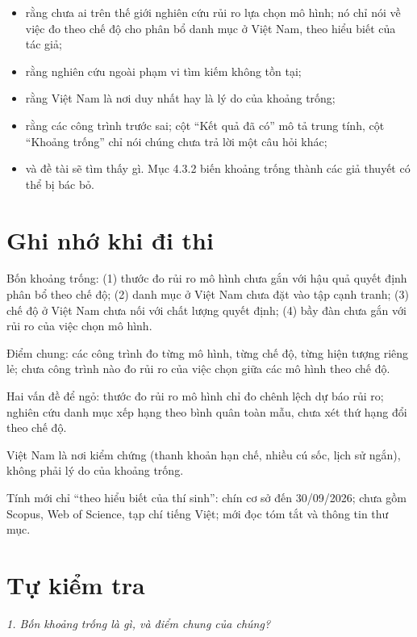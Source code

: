 \begin{itemize}
\item
  rằng chưa ai trên thế giới nghiên cứu rủi ro lựa chọn mô hình; nó chỉ nói về việc đo theo chế độ cho phân bổ danh mục ở Việt Nam, theo hiểu biết của tác giả;
\item
  rằng nghiên cứu ngoài phạm vi tìm kiếm không tồn tại;
\item
  rằng Việt Nam là nơi duy nhất hay là lý do của khoảng trống;
\item
  rằng các công trình trước sai; cột “Kết quả đã có” mô tả trung tính, cột “Khoảng trống” chỉ nói chúng chưa trả lời một câu hỏi khác;
\item
  và đề tài sẽ tìm thấy gì. Mục 4.3.2 biến khoảng trống thành các giả thuyết có thể bị bác bỏ.
\end{itemize}

\section{Ghi nhớ khi đi thi}

\begin{tcolorbox}[breakable]
Bốn khoảng trống: (1) thước đo rủi ro mô hình chưa gắn với hậu quả quyết định phân bổ theo chế độ; (2) danh mục ở Việt Nam chưa đặt vào tập cạnh tranh; (3) chế độ ở Việt Nam chưa nối với chất lượng quyết định; (4) bầy đàn chưa gắn với rủi ro của việc chọn mô hình.

Điểm chung: các công trình đo từng mô hình, từng chế độ, từng hiện tượng riêng lẻ; chưa công trình nào đo rủi ro của việc chọn giữa các mô hình theo chế độ.

Hai vấn đề để ngỏ: thước đo rủi ro mô hình chỉ đo chênh lệch dự báo rủi ro; nghiên cứu danh mục xếp hạng theo bình quân toàn mẫu, chưa xét thứ hạng đổi theo chế độ.

Việt Nam là nơi kiểm chứng (thanh khoản hạn chế, nhiều cú sốc, lịch sử ngắn), không phải lý do của khoảng trống.

Tính mới chỉ “theo hiểu biết của thí sinh”: chín cơ sở đến 30/09/2026; chưa gồm Scopus, Web of Science, tạp chí tiếng Việt; mới đọc tóm tắt và thông tin thư mục.
\end{tcolorbox}

\section{Tự kiểm tra}

{\itshape 1. Bốn khoảng trống là gì, và điểm chung của chúng?\par}

